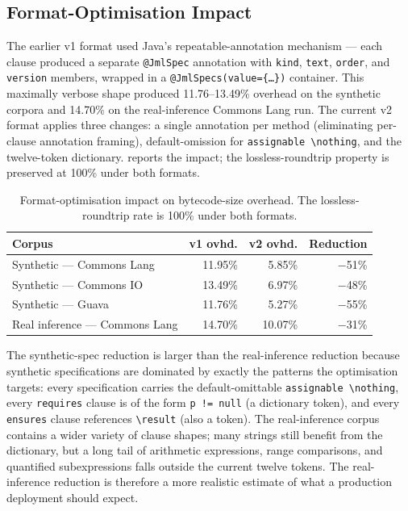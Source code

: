\subsection{Format-Optimisation Impact}
\label{subsec:a2-format-opt}

The earlier v1 format used Java's repeatable-annotation mechanism --- each clause
produced a separate \texttt{@JmlSpec} annotation with \texttt{kind},
\texttt{text}, \texttt{order}, and \texttt{version} members, wrapped in a
\texttt{@JmlSpecs(value=\{\dots\})} container. This maximally verbose shape
produced 11.76--13.49\% overhead on the synthetic corpora and 14.70\% on the
real-inference Commons Lang run. The current v2 format applies three changes: a
single annotation per method (eliminating per-clause annotation framing),
default-omission for \texttt{assignable \textbackslash nothing}, and the twelve-token
dictionary.  reports the impact; the lossless-roundtrip property
is preserved at 100\% under both formats.

\begin{table}[ht]
\centering
\caption{Format-optimisation impact on bytecode-size overhead. The
lossless-roundtrip rate is 100\% under both formats.}
\label{tab:a2-opt}
\setlength{\tabcolsep}{3pt}
\begin{tabular}{lrrr}
\toprule
\textbf{Corpus} & \textbf{v1 ovhd.} & \textbf{v2 ovhd.} & \textbf{Reduction} \\
\midrule
Synthetic --- Commons Lang      & 11.95\% & 5.85\%  & $-$51\% \\
Synthetic --- Commons IO        & 13.49\% & 6.97\%  & $-$48\% \\
Synthetic --- Guava             & 11.76\% & 5.27\%  & $-$55\% \\
\midrule
Real inference --- Commons Lang & 14.70\% & 10.07\% & $-$31\% \\
\bottomrule
\end{tabular}
\end{table}

The synthetic-spec reduction is larger than the real-inference reduction because
synthetic specifications are dominated by exactly the patterns the optimisation
targets: every specification carries the default-omittable
\texttt{assignable \textbackslash nothing}, every \texttt{requires} clause is of
the form \texttt{p != null} (a dictionary token), and every \texttt{ensures}
clause references \texttt{\textbackslash result} (also a token). The
real-inference corpus contains a wider variety of clause shapes; many strings
still benefit from the dictionary, but a long tail of arithmetic expressions,
range comparisons, and quantified subexpressions falls outside the current twelve
tokens. The real-inference reduction is therefore a more realistic estimate of
what a production deployment should expect.

